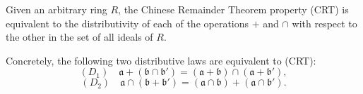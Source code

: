 Given an arbitrary ring $R$, the Chinese Remainder Theorem property (CRT) is equivalent to the distributivity of each of the operations $+$ and $\cap$ with respect to the other in the set of all ideals of $R$.

Concretely, the following two distributive laws are equivalent to (CRT):
$$(D_1) \quad \mathfrak{a} + (\mathfrak{b} \cap \mathfrak{b}') = (\mathfrak{a} + \mathfrak{b}) \cap (\mathfrak{a} + \mathfrak{b}'),$$
$$(D_2) \quad \mathfrak{a} \cap (\mathfrak{b} + \mathfrak{b}') = (\mathfrak{a} \cap \mathfrak{b}) + (\mathfrak{a} \cap \mathfrak{b}').$$
